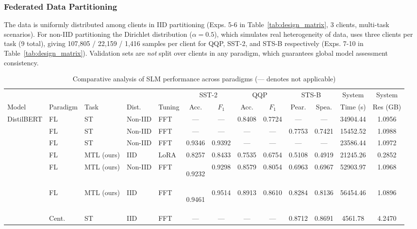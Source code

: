 \subsubsection{Federated Data Partitioning} The data is uniformly distributed among clients in IID partitioning (Exps. 5-6 in Table~\ref{tab:design_matrix}, 3 clients, multi-task scenarios). For non-IID partitioning the Dirichlet distribution ($\alpha{=}0.5$), which simulates real heterogeneity of data, uses three clients per task (9 total), giving 107,805 / 22,159 / 1,416 samples per client for QQP, SST-2, and STS-B respectively (Exps. 7-10 in Table~\ref{tab:design_matrix}). Validation sets are \emph{not} split over clients in any paradigm, which guarantees global model assessment consistency.

\begin{table}[t]
  \centering
  \caption{Comparative analysis of SLM performance across paradigms (--- denotes not applicable)}
  \label{tab:results_consolidated}
  \scriptsize
  \setlength{\tabcolsep}{3pt}
  \begin{tabular}{lllllcccccccc}
    \toprule
    & & & & & \multicolumn{2}{c}{SST-2} & \multicolumn{2}{c}{QQP} & \multicolumn{2}{c}{STS-B} & System & System \\
    \cmidrule(lr){6-7} \cmidrule(lr){8-9} \cmidrule(lr){10-11}
    Model & Paradigm & Task & Dist. & Tuning & Acc. & $F_1$ & Acc. & $F_1$ & Pear. & Spea. & Time (s) & Res (GB) \\
    \midrule
    DistilBERT \cite{sanh2019distilbert} & FL & ST & Non-IID & FFT & --- & --- & 0.8408 & 0.7724 & --- & --- & 34904.44 & 1.0956 \\
     & FL & ST & Non-IID & FFT & --- & --- & --- & --- & 0.7753 & 0.7421 & 15452.52 & 1.0988 \\
     & FL & ST & Non-IID & FFT & 0.9346 & 0.9392 & --- & --- & --- & --- & 23586.44 & 1.0972 \\
     & FL & MTL (ours) & IID & LoRA & 0.8257 & 0.8433 & 0.7535 & 0.6754 & 0.5108 & 0.4919 & 21245.26 & 0.2852 \\
      & FL & MTL (ours) & Non-IID & FFT & \hypertarget{perf:distilbert_sst2_fl_noniid}{0.9232} & 0.9298 & 0.8579 & 0.8054 & 0.6963 & 0.6967 & 52903.97 & 1.0968 \\
      & FL & MTL (ours) & IID & FFT & \hypertarget{perf:distilbert_sst2_fl_iid}{0.9461} & 0.9514 & 0.8913 & 0.8610 & 0.8284 & 0.8136 & 56454.46 & 1.0896 \\
     & Cent. & ST & IID & FFT & --- & --- & --- & --- & 0.8712 & 0.8691 & 4561.78 & 4.2470 \\

\end{tabular}
\end{table}
